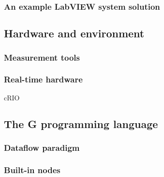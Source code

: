 \subsubsection{An example LabVIEW system solution}
\subsection{Hardware and environment}
\subsubsection{Measurement tools}
\subsubsection{Real-time hardware}
cRIO
\subsection{The G programming language}
\subsubsection{Dataflow paradigm}
\subsubsection{Built-in nodes}
